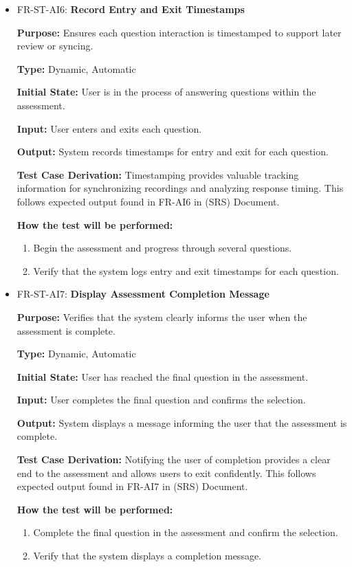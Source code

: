 \documentclass[12pt, titlepage]{article}
\begin{document}
\begin{itemize}
  \item FR-ST-AI6: \textbf{Record Entry and Exit Timestamps}
  \begin{mdframed}[linewidth=0.5mm]
      \textbf{Purpose:} Ensures each question interaction is timestamped to support later review or syncing. \par
      \textbf{Type:} Dynamic, Automatic \par
      \textbf{Initial State:} User is in the process of answering questions within the assessment. \par
      \textbf{Input:} User enters and exits each question. \par
      \textbf{Output:} System records timestamps for entry and exit for each question. \par
      \textbf{Test Case Derivation:} Timestamping provides valuable tracking information for 
      synchronizing recordings and analyzing response timing. 
      This follows expected output found in FR-AI6 in (SRS) Document. \par
      \textbf{How the test will be performed:}
      \begin{enumerate}[noitemsep]
        \item Begin the assessment and progress through several questions.
        \item Verify that the system logs entry and exit timestamps for each question.
      \end{enumerate}
  \end{mdframed}

  \item FR-ST-AI7: \textbf{Display Assessment Completion Message}
  \begin{mdframed}[linewidth=0.5mm]
      \textbf{Purpose:} Verifies that the system clearly informs the user when the assessment is complete. \par
      \textbf{Type:} Dynamic, Automatic \par
      \textbf{Initial State:} User has reached the final question in the assessment. \par
      \textbf{Input:} User completes the final question and confirms the selection. \par
      \textbf{Output:} System displays a message informing the user that the assessment is complete. \par
      \textbf{Test Case Derivation:} Notifying the user of completion provides a clear end to 
      the assessment and allows users to exit confidently. 
      This follows expected output found in FR-AI7 in (SRS) Document. \par
      \textbf{How the test will be performed:}
      \begin{enumerate}[noitemsep]
        \item Complete the final question in the assessment and confirm the selection.
        \item Verify that the system displays a completion message.
      \end{enumerate}
  \end{mdframed}
\end{itemize}
\end{document}
